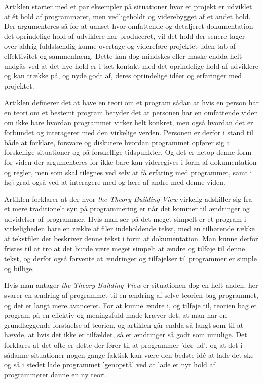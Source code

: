 \documentclass[11pt, a4paper]{article}
\begin{document}
Artiklen starter med et par eksempler på situationer hvor et projekt er udviklet af ét hold af programmører, men vedligeholdt og viderebygget af et andet hold. Der argumenteres så for at uanset hvor omfattende og detaljeret dokumentation det oprindelige hold af udviklere har produceret, vil det hold der senere tager over aldrig fuldstændig kunne overtage og videreføre projektet uden tab af effektivitet og sammenhæng. Dette kan dog mindskes eller måske endda helt undgås ved at det nye hold er i tæt kontakt med det oprindelige hold af udviklere og kan trække på, og nyde godt af, deres oprindelige idéer og erfaringer med projektet.

Artiklen definerer det at have en teori om et program sådan at hvis en person har en teori om et bestemt program betyder det at personen har en omfattende viden om ikke bare hvordan programmet virker helt konkret, men også hvordan det er forbundet og interagerer med den virkelige verden. Personen er derfor i stand til både at forklare, forsvare og diskutere hvordan programmet opfører sig i forskellige situationer og på forskellige tidspunkter. Og det er netop denne form for viden der argumenteres for ikke bare kan videregives i form af dokumentation og regler, men som skal tilegnes ved selv at få erfaring med programmet, samt i høj grad også ved at interagere med og lære af andre med denne viden.

Artiklen forklarer at der hvor \emph{the Theory Building View} virkelig adskiller sig fra et mere traditionelt syn på programmering er når det kommer til ændringer og udvidelser af programmer. Hvis man ser på det meget simpelt er et program i virkeligheden bare en række af filer indeholdende tekst, med en tilhørende række af tekstfiler der beskriver denne tekst i form af dokumentation. Man kunne derfor fristes til at tro at det burde være meget simpelt at ændre og tilføje til denne tekst, og derfor også forvente at ændringer og tilføjelser til programmer er simple og billige.

Hvis man antager \emph{the Theory Building View} er situationen dog en helt anden; her svarer en ændring af programmet til en ændring af selve teorien bag programmet, og det er langt mere avanceret. For at kunne ændre i, og tilføje til, teorien bag et program på en effektiv og meningsfuld måde kræver det, at man har en grundlæggende forståelse af teorien, og artiklen går endda så langt som til at hævde, at hvis det ikke er tilfældet, så er ændringer så godt som umulige. Det forklares at det ofte er dette der fører til at programmer 'dør ud', og at det i sådanne situationer nogen gange faktisk kan være den bedste idé at lade det ske og så i stedet lade programmet 'genopstå' ved at lade et nyt hold af programmører danne en ny teori.
\end{document}
